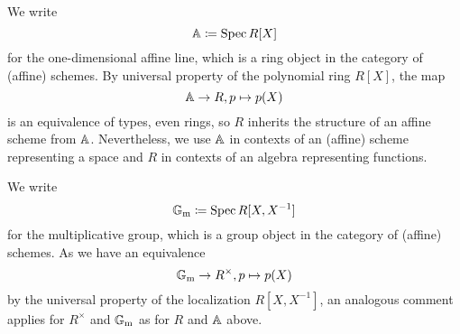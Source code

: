 We write
\begin{equation*}
  \mathbb{A} \coloneqq \operatorname{Spec} R[X]
\end{equation*}
for the one-dimensional affine line, which is a ring object in the
category of (affine) schemes.  By universal property of the polynomial
ring $R[X]$, the map
\begin{equation*}
  \mathbb{A} \to R, p \mapsto p(X)
\end{equation*}
is an equivalence of types, even rings, so $R$
inherits the structure of an affine scheme from $\mathbb{A}$.  Nevertheless,
we use $\mathbb{A}$ in contexts of an (affine) scheme representing a space and
$R$ in contexts of an algebra representing functions.

We write
\begin{equation*}
  \mathbb{G}_\mathrm{m} \coloneqq \operatorname{Spec} R[X, X^{-1}]
\end{equation*}
for the multiplicative group, which is a group object in the category of (affine) schemes.  As we have an equivalence
\begin{equation*}
  \mathbb{G}_\mathrm{m} \to R^\times, p \mapsto p(X)
\end{equation*}
by the universal property of the localization $R[X, X^{-1}]$, an
analogous comment applies for $R^\times$ and $\mathbb{G}_\mathrm{m}$ as for $R$ and $\mathbb{A}$
above.

